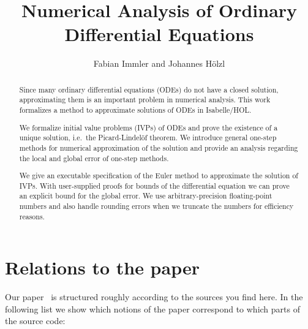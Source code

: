 \documentclass[11pt,a4paper]{article}
\title{Numerical Analysis of Ordinary Differential Equations}
\author{Fabian Immler and Johannes Hölzl}
\begin{document}
\maketitle

\begin{abstract}

  Since many ordinary differential equations (ODEs) do not have a
  closed solution, approximating them is an important problem in
  numerical analysis. This work formalizes a method to approximate
  solutions of ODEs in Isabelle/HOL.

  We formalize initial value problems (IVPs) of ODEs and prove the
  existence of a unique solution, i.e.\ the Picard-Lindelöf
  theorem. We introduce general one-step methods for numerical
  approximation of the solution and provide an analysis regarding the
  local and global error of one-step methods.

  We give an executable specification of the Euler method to
  approximate the solution of IVPs. With user-supplied proofs for
  bounds of the differential equation we can prove an explicit bound
  for the global error. We use arbitrary-precision floating-point
  numbers and also handle rounding errors when we truncate the numbers
  for efficiency reasons.

\end{abstract}

\section{Relations to the paper}

Our paper~\cite{immlerhoelzl} is structured
roughly according to the sources you find here. In the following list we
show which notions of the paper correspond to which parts of the source code:
\end{document}
